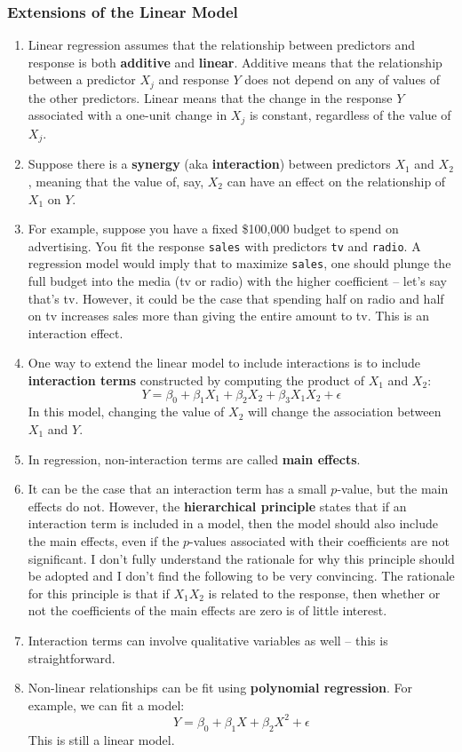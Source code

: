 \documentclass[10pt]{article}
\newcommand{\eps}{\epsilon}
\begin{document}
\vspace{.2in} 

\subsubsection{Extensions of the Linear Model}
\begin{enumerate}
	\item Linear regression assumes that the relationship between predictors and response is both \textbf{additive} and \textbf{linear}. Additive means that the relationship between a predictor $X_j$ and response $Y$ does not depend on any of values of the other predictors.  Linear means that the change in the response $Y$ associated with a one-unit change in $X_j$ is constant, regardless of the value of $X_j$.  
	\item Suppose there is a \textbf{synergy} (aka \textbf{interaction}) between predictors $X_1$ and $X_2$, meaning that the value of, say, $X_2$ can have an effect on the relationship of $X_1$ on $Y$.
	\item For example, suppose you have a fixed \$100,000 budget to spend on advertising.  You fit the response {\tt sales} with predictors {\tt tv} and {\tt radio}. A regression model would imply that to maximize {\tt sales}, one should plunge the full budget into the media (tv or radio) with the higher coefficient -- let's say that's tv.  However, it could be the case that spending half on radio and half on tv increases sales more than giving the entire amount to tv.  This is an interaction effect. 
	\item One way to extend the linear model to include interactions is to include \textbf{interaction terms} constructed by computing the product of $X_1$ and $X_2$:
	$$Y = \beta_0 + \beta_1 X_1 + \beta_2 X_2 + \beta_3 X_1X_2 + \eps$$
	In this model, changing the value of $X_2$ will change the association between $X_1$ and $Y$.
	\item In regression, non-interaction terms are called \textbf{main effects}. 
	\item It can be the case that an interaction term has a small $p$-value, but the main effects do not.  However, the \textbf{hierarchical principle} states that if an interaction term is included in a model, then the model should also include the main effects, even if the $p$-values associated with their coefficients are not significant. {\color{brown} I don't fully understand the rationale for why this principle should be adopted and I don't find the following to be very convincing.} The rationale for this principle is that if $X_1X_2$ is related to the response, then whether or not the coefficients of the main effects are zero is of little interest.
	\item Interaction terms can involve qualitative variables as well -- this is straightforward.
	\item Non-linear relationships can be fit using \textbf{polynomial regression}.  For example, we can fit a model:
	$$Y = \beta_0 + \beta_1 X + \beta_2 X^2 + \eps$$
	This is still a linear model.  
\end{enumerate}
\vspace{.2in} 
\end{document}
